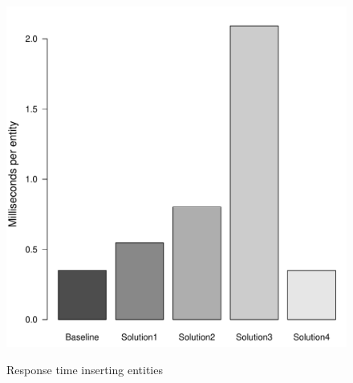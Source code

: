 \begin{landscape}
\begin{figure}
			{\includegraphics[width=\W]{figure/result/barplot-insert_course-rt.pdf}
			\label{fres:insert-course}}
			\caption{Response time inserting entities}\label{fres:insert-response-time}
			

\end{figure}
\end{landscape}
